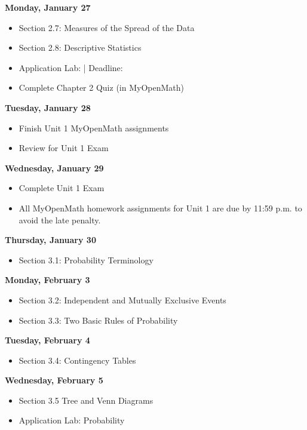 \documentclass[11pt]{article}
\begin{document}
\textbf{Monday, January 27}

\begin{itemize}
\item Section 2.7: Measures of the Spread of the Data
\item Section 2.8: Descriptive Statistics
\item Application Lab: | Deadline:
\item Complete Chapter 2 Quiz (in MyOpenMath)
\end{itemize}

\textbf{Tuesday, January 28}

\begin{itemize}
\item Finish Unit 1 MyOpenMath assignments
\item Review for Unit 1 Exam
\end{itemize}

\textbf{Wednesday, January 29}

\begin{itemize}
\item Complete Unit 1 Exam
\item All MyOpenMath homework assignments for Unit 1 are due by 11:59 p.m. to avoid the late penalty.
\end{itemize}

\textbf{Thursday, January 30}

\begin{itemize}
\item Section 3.1: Probability Terminology
\end{itemize}

\textbf{Monday, February 3}

\begin{itemize}
\item Section 3.2: Independent and Mutually Exclusive Events
\item Section 3.3: Two Basic Rules of Probability
\end{itemize}

\textbf{Tuesday, February 4}

\begin{itemize}
\item Section 3.4: Contingency Tables
\end{itemize}

\textbf{Wednesday, February 5}

\begin{itemize}
\item Section 3.5 Tree and Venn Diagrams
\item Application Lab: Probability
\end{itemize}
\end{document}
